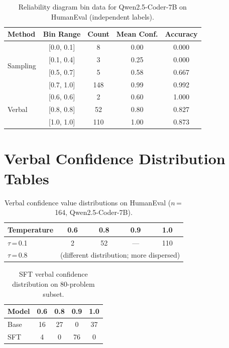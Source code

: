 \documentclass{article}
\begin{document}
\begin{table}[h]
\centering
\caption{Reliability diagram bin data for Qwen2.5-Coder-7B on HumanEval (independent labels).}
\label{tab:bins}
\small
\setlength{\tabcolsep}{3pt}
\begin{tabular}{@{}lcccc@{}}
\toprule
\textbf{Method} & \textbf{Bin Range} & \textbf{Count} & \textbf{Mean Conf.} & \textbf{Accuracy} \\
\midrule
\multirow{4}{*}{Sampling} & [0.0, 0.1] & 8 & 0.00 & 0.000 \\
 & [0.1, 0.4] & 3 & 0.25 & 0.000 \\
 & [0.5, 0.7] & 5 & 0.58 & 0.667 \\
 & [0.7, 1.0] & 148 & 0.99 & 0.992 \\
\midrule
\multirow{3}{*}{Verbal} & [0.6, 0.6] & 2 & 0.60 & 1.000 \\
 & [0.8, 0.8] & 52 & 0.80 & 0.827 \\
 & [1.0, 1.0] & 110 & 1.00 & 0.873 \\
\bottomrule
\end{tabular}
\end{table}

\section{Verbal Confidence Distribution Tables}
\label{app:verbal_dist}

\begin{table}[h]
\centering
\caption{Verbal confidence value distributions on HumanEval ($n$\,=\,164, Qwen2.5-Coder-7B).}
\label{tab:verbal_detail}
\small
\begin{tabular}{@{}lcccc@{}}
\toprule
\textbf{Temperature} & \textbf{0.6} & \textbf{0.8} & \textbf{0.9} & \textbf{1.0} \\
\midrule
$\tau$\,=\,0.1 & 2 & 52 & --- & 110 \\
$\tau$\,=\,0.8 & \multicolumn{4}{c}{(different distribution; more dispersed)} \\
\bottomrule
\end{tabular}
\end{table}

\begin{table}[h]
\centering
\caption{SFT verbal confidence distribution on 80-problem subset.}
\label{tab:sft_verbal}
\small
\begin{tabular}{@{}lcccc@{}}
\toprule
\textbf{Model} & \textbf{0.6} & \textbf{0.8} & \textbf{0.9} & \textbf{1.0} \\
\midrule
Base & 16 & 27 & 0 & 37 \\
SFT & 4 & 0 & 76 & 0 \\
\bottomrule
\end{tabular}
\end{table}
\end{document}
